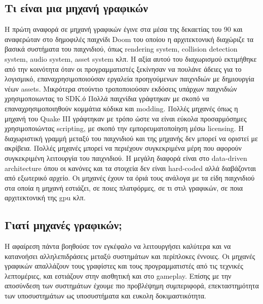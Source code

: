 	\subsection {Τι είναι μια μηχανή γραφικών}
	Η πρώτη αναφορά σε μηχανή γραφικών έγινε στα μέσα της δεκαετίας του 90 και αναφερώταν στο δημοφιλές παιχνίδι Doom του οποίου η αρχιτεκτονική διαχώριζε τα βασικά συστήματα του παιχνιδιού, όπως rendering system, collision detection system, audio system, asset system κλπ. Η αξία αυτού του διαχωρισμού εκτιμήθηκε από την κοινότητα όταν οι προγραμματιστές ξεκίνησαν να πουλάνε άδειες για το λογισμικό, επαναχρησιμοποιούσαν εργαλεία προηγούμενων παιχνιδιών με δημιουργία νέων assets. Μικρότερα στούντιο τροποποιούσαν εκδόσεις υπάρχων παιχνιδιών χρησιμοποιωντας το SDK.ό
	Πολλά παιχνίδια γράφτηκαν με σκοπό να επαναχρησιμοποιηθούν κομμάτια κόδικα και modding. Πολλές μηχανές όπως η μηχανή του Quake III γράφτηκαν με τρόπο ώστε να είναι εύκολα προσαρμόσημες χρησιμοποιώντας scripting, με σκοπό την εμπορευματοποίηση μέσω licensing.
	Η διαχωριστική γραμμή μεταξύ του παιχνιδιού και της μηχανής δεν μπορεί να οριστεί με ακρίβεια. Πολλές μηχανές μπορεί να περιέχουν συγκεκριμένα μέρη που αφορούν συγκεκριμένη λειτουργία του παιχνιδιού. Η μεγάλη διαφορά είναι στο data-driven architecture όπου οι κανόνες και τα στοιχεία δεν είναι hard-coded αλλά διαβάζονται από εξωτερικό αρχείο.
	Οι μηχανές έχουν τα όριά τους ανάλογα με τα είδη παιχνιδιού στα οποία η μηχανή εστιάζει, σε ποιες πλατφόρμες, σε τι στιλ γραφικών, σε ποια αρχιτεκτονική της gpu κλπ. 
	
	\subsection{Γιατί μηχανές γραφικών;}	
	Η αφαίρεση πάντα βοηθούσε τον εγκέφαλο να λειτουργήσει καλύτερα και να κατανοήσει αλληλεπιδράσεις μεταξύ συστημάτων και περίπλοκες έννοιες. Οι μηχανές γραφικών απαλλάζουν τους γραφίστες και τους προγραμματιστές από τις τεχνικές λεπτομέριες, και εστιάζουν στην αισθητική και στο gameplay. Επίσης με την αποσύνδεση των συστημάτων έχουμε πιο προβλέψημη συμπεριφορά, επεκταστημότητα των υποσυστημάτων ως υποσυστήματα και ευκολη δοκιμαστικότητα.
	
